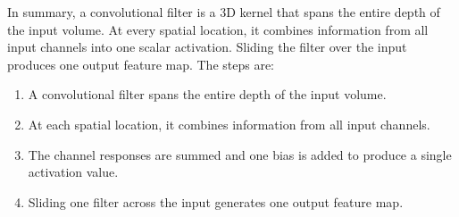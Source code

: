 \highspace
\begin{takeawaysbox}
    In summary, a convolutional filter is a 3D kernel that spans the entire depth of the input volume. At every spatial location, it combines information from all input channels into one scalar activation. Sliding the filter over the input produces one output feature map. The steps are:
    \begin{enumerate}
        \item A convolutional filter spans the entire depth of the input volume.
        \item At each spatial location, it combines information from all input channels.
        \item The channel responses are summed and one bias is added to produce a single activation value.
        \item Sliding one filter across the input generates one output feature map.
    \end{enumerate}
\end{takeawaysbox}